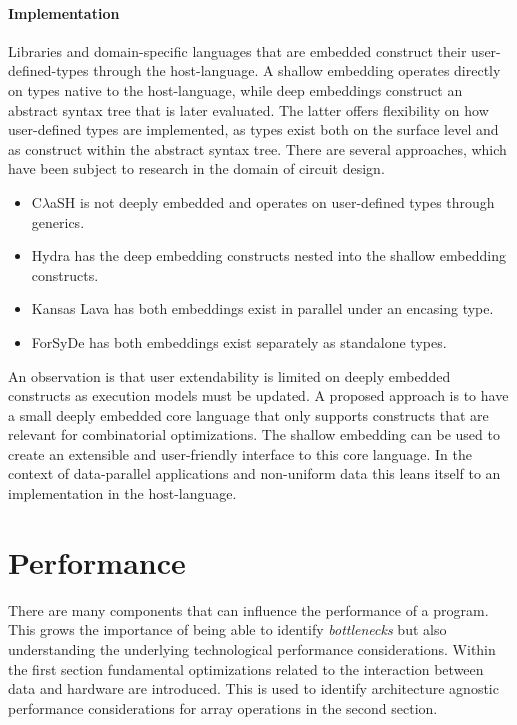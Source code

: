 \documentclass{article}
\begin{document}
\paragraph{Implementation}

Libraries and domain-specific languages that are embedded construct their user-defined-types through the host-language.
A shallow embedding operates directly on types native to the host-language, while deep embeddings construct an abstract syntax tree that is later evaluated.
The latter offers flexibility on how user-defined types are implemented, as types exist both on the surface level and as construct within the abstract syntax tree.   
There are several approaches, which have been subject to research in the domain of circuit design.
\begin{itemize}
    \setlength\itemsep{0em}
    \item {C$\lambda$aSH} is not deeply embedded and operates on user-defined types through generics\cite{clash}. 
    \item Hydra has the deep embedding constructs nested into the shallow embedding constructs\cite{hydra}.
    \item Kansas Lava has both embeddings exist in parallel under an encasing type\cite{kansas-lava}.
    \item ForSyDe has both embeddings exist separately as standalone types\cite{forsyde}.
\end{itemize}

An observation is that user extendability is limited on deeply embedded constructs as execution models must be updated.
A proposed approach is to have a small deeply embedded core language that only supports constructs that are relevant for combinatorial optimizations\cite{shallow-and-deep}. 
The shallow embedding can be used to create an extensible and user-friendly interface to this core language.
In the context of data-parallel applications and non-uniform data this leans itself to an implementation in the host-language.

\newpage

\section{Performance}

There are many components that can influence the performance of a program.
This grows the importance of being able to identify {\it bottlenecks} but also understanding the underlying technological performance considerations\cite{programming-optimization}.
Within the first section fundamental optimizations related to the interaction between data and hardware are introduced.
This is used to identify architecture agnostic performance considerations for array operations in the second section.
\end{document}
